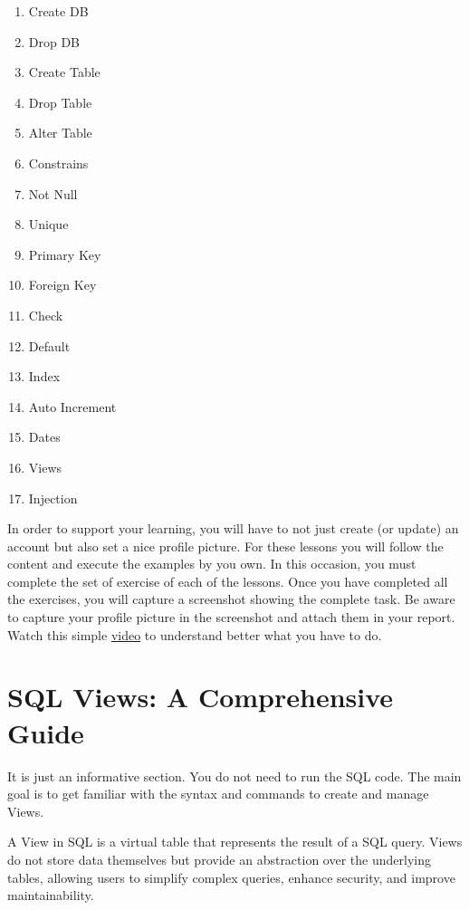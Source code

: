 \documentclass{article}
\begin{document}
\begin{enumerate}
  \item Create DB
  \item Drop DB
  \item Create Table
  \item Drop Table
  \item Alter Table
  \item Constrains
  \item Not Null
  \item Unique
  \item Primary Key
  \item Foreign Key
  \item Check
  \item Default
  \item Index
  \item Auto Increment
  \item Dates
  \item Views
  \item Injection
\end{enumerate}

In order to support your learning, you will have to not just create (or update) an account but also set a nice profile picture.  For these lessons you will follow the content and execute the examples by you own.  In this occasion, you must complete the set of exercise of each of the lessons.  Once you have completed all the exercises, you will capture a screenshot showing the complete task.  Be aware to capture your profile picture in the screenshot and attach them in your report.  Watch this simple \href{https://drive.google.com/file/d/1cMssK6Az56eU3QyCk4hMVr6DfQ9nRsv7/view?usp=sharing}{video} to understand better what you have to do.

\section{SQL Views: A Comprehensive Guide}

\begin{boxH}
It is just an informative section.  You do not need to run the SQL code.  The main goal is to get familiar with the syntax and commands to create and manage Views.
\end{boxH}

A View in SQL is a virtual table that represents the result of a SQL query. Views do not store data themselves but provide an abstraction over the underlying tables, allowing users to simplify complex queries, enhance security, and improve maintainability.
\end{document}
